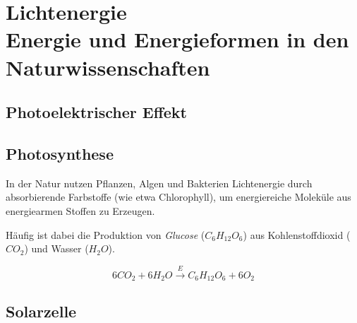 \section[Lichtenergie\hfill Energie und Energieformen in den Naturwissenschaften]{Lichtenergie\\{\normalsize Energie und Energieformen in den Naturwissenschaften}}

\subsection{Photoelektrischer Effekt}\label{subsec:photoeffekt}



\subsection{Photosynthese}
In der Natur nutzen Pflanzen, Algen und Bakterien Lichtenergie durch absorbierende Farbstoffe (wie etwa Chlorophyll), um energiereiche Moleküle aus energiearmen Stoffen zu Erzeugen.


Häufig ist dabei die Produktion von \textit{Glucose} ($C_6H_{12}O_6$) aus Kohlenstoffdioxid ($CO_2$) und Wasser ($H_2O$).

$$6CO_2 + 6H_2O \xrightarrow{E} C_6H_{12}O_6 + 6O_2$$

\subsection{Solarzelle}
